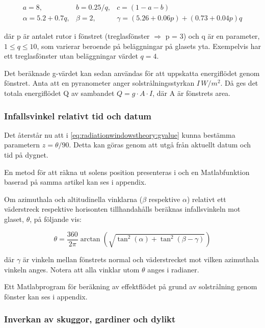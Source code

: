 \begin{eqnarray}
a = 8, & b = 0.25/q, & c = (1-a-b) \nonumber \\
\alpha = 5.2 + 0.7q, & \beta = 2, & \gamma = (5.26+0.06p) + (0.73+0.04p)q
\end{eqnarray}

där p är antalet rutor i fönstret (treglasfönster $\Rightarrow$ p = 3) och q är en parameter, $1 \le q \le 10$, som varierar beroende på beläggningar på glasets yta. Exempelvis har ett treglasfönster utan beläggningar värdet $q=4$.

Det beräknade g-värdet kan sedan användas för att uppskatta energiflödet genom fönstret. Anta att en pyranometer anger solstrålningsstyrkan $\unit{I\, }{W/m^2}$. Då ges det totala energiflödet Q av sambandet $Q = g \cdot A \cdot I$, där A är fönstrets area.

\subsubsection{Infallsvinkel relativt tid och datum}

Det återstår nu att i \eqref{eq:radiationwindowstheory:gvalue} kunna bestämma parametern $z = \theta/90$. Detta kan göras genom att utgå från aktuellt datum och tid på dygnet.

En metod för att räkna ut solens position presenteras i \cite{walraven78} och en Matlabfunktion baserad på samma artikel kan ses i appendix. %

Om azimuthala och altitudinella vinklarna ($\beta$ respektive $\alpha$) relativt ett väderstreck respektive horisonten tillhandahålls beräknas infallsvinkeln mot glaset, $\theta$, på följande vis:

\begin{equation} 
\theta = \frac{360}{2\pi}\arctan{\left( \sqrt{\tan^2{\left(\alpha\right)}
+ \tan^2{\left(\beta - \gamma \right)}} \right)}
\end{equation}

där $\gamma$ är vinkeln mellan fönstrets normal och väderstrecket mot vilken azimuthala vinkeln anges. Notera att alla vinklar utom $\theta$ anges i radianer.

Ett Matlabprogram för beräkning av effektflödet på grund av solstrålning genom fönster kan ses i appendix. %


\subsubsection{Inverkan av skuggor, gardiner och dylikt}

